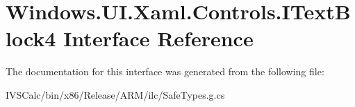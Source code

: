 \hypertarget{interface_windows_1_1_u_i_1_1_xaml_1_1_controls_1_1_i_text_block4}{}\section{Windows.\+U\+I.\+Xaml.\+Controls.\+I\+Text\+Block4 Interface Reference}
\label{interface_windows_1_1_u_i_1_1_xaml_1_1_controls_1_1_i_text_block4}


The documentation for this interface was generated from the following file\+:\begin{DoxyCompactItemize}
\item 
I\+V\+S\+Calc/bin/x86/\+Release/\+A\+R\+M/ilc/Safe\+Types.\+g.\+cs\end{DoxyCompactItemize}
